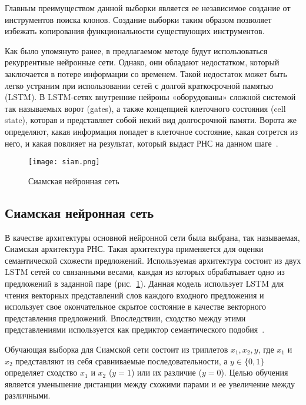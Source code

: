 Главным преимуществом данной выборки является ее независимое создание от инструментов поиска клонов. Создание выборки таким образом позволяет избежать копирования функциональности существующих инструментов. 

Как было упомянуто ранее, в предлагаемом методе будут использоваться рекуррентные нейронные сети. Однако, они обладают недостатком, который заключается в потере информации со временем. Такой недостаток может быть легко устраним при использовании сетей с долгой краткосрочной памятью (LSTM). В LSTM-сетях внутренние нейроны «оборудованы» сложной системой так называемых ворот (gates), а также концепцией клеточного состояния (cell state), которая и представляет собой некий вид долгосрочной памяти. Ворота же определяют, какая информация попадет в клеточное состояние, какая сотрется из него, и какая повлияет на результат, который выдаст РНС на данном шаге~\cite{siam}.


\begin{figure}[htbp]
\centering
\texttt{[image: siam.png]}
\caption{Сиамская нейронная сеть}
\label{fig:siam_mod}
\end{figure}

\subsection{Сиамская нейронная сеть}

В качестве архитектуры основной нейронной сети была выбрана, так называемая, Сиамская архитектура РНС. Такая архитектура применяется для оценки семантической схожести предложений. Используемая архитектура состоит из двух LSTM сетей со связанными весами, каждая из которых обрабатывает одно из предложений в заданной паре (рис.~\ref{fig:siam_mod}). Данная модель использует LSTM для чтения векторных представлений слов каждого входного предложения и использует свое окончательное скрытое состояние в качестве векторного представления предложений. Впоследствии, сходство между этими представлениями используется как предиктор семантического подобия~\cite{siam}.

Обучающая выборка для Сиамской сети состоит из триплетов \(x_1, x_2, y\), где \(x_1\) и \(x_2\) представляют из себя сравниваемые последовательности, а \(y \in \{0,1\}\) определяет сходство \(x_1\) и \(x_2\) (\(y = 1\)) или их различие (\(y = 0\)). Целью обучения является уменьшение дистанции между схожими парами и ее увеличение между различными.

